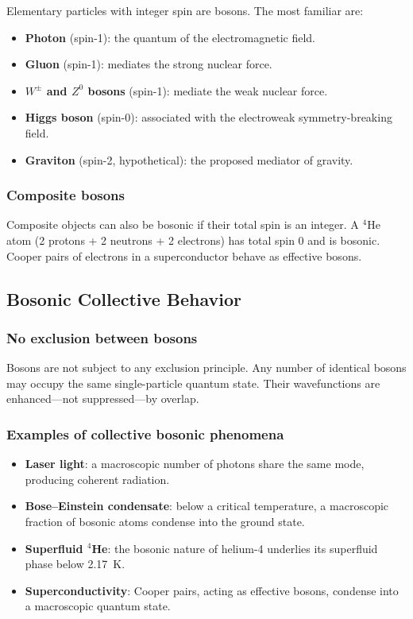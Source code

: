 \documentclass[11pt,a4paper]{article}
\begin{document}
Elementary particles with integer spin are bosons.  The most familiar are:
\begin{itemize}
  \item \textbf{Photon} (spin-1): the quantum of the electromagnetic field.
  \item \textbf{Gluon} (spin-1): mediates the strong nuclear force.
  \item \textbf{$W^\pm$ and $Z^0$ bosons} (spin-1): mediate the weak nuclear force.
  \item \textbf{Higgs boson} (spin-0): associated with the electroweak symmetry-breaking field.
  \item \textbf{Graviton} (spin-2, hypothetical): the proposed mediator of gravity.
\end{itemize}

\subsubsection{Composite bosons}

Composite objects can also be bosonic if their total spin is an integer.
A $^4\text{He}$ atom (2 protons + 2 neutrons + 2 electrons) has total spin 0
and is bosonic.  Cooper pairs of electrons in a superconductor behave as
effective bosons.

\subsection{Bosonic Collective Behavior}

\subsubsection{No exclusion between bosons}

Bosons are not subject to any exclusion principle.  Any number of identical
bosons may occupy the same single-particle quantum state.  Their wavefunctions
are enhanced---not suppressed---by overlap.

\subsubsection{Examples of collective bosonic phenomena}

\begin{itemize}
  \item \textbf{Laser light}: a macroscopic number of photons share the same
        mode, producing coherent radiation.
  \item \textbf{Bose--Einstein condensate}: below a critical temperature, a
        macroscopic fraction of bosonic atoms condense into the ground state.
  \item \textbf{Superfluid $^4$He}: the bosonic nature of helium-4 underlies
        its superfluid phase below 2.17~K.
  \item \textbf{Superconductivity}: Cooper pairs, acting as effective bosons,
        condense into a macroscopic quantum state.
\end{itemize}
\end{document}
